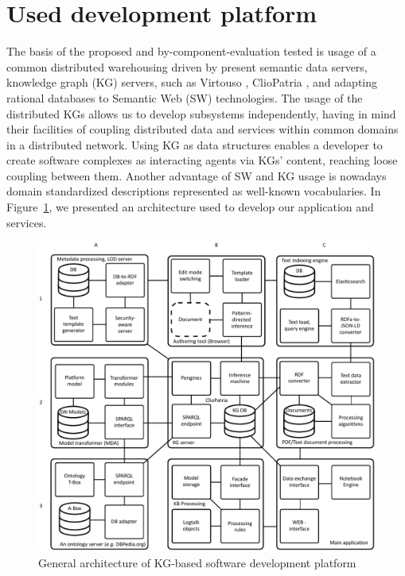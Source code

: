 \documentclass[
]{ceurart}
\begin{document}
\section{Used development platform}

The basis of the proposed and by-component-evaluation tested is usage of a common distributed warehousing driven by present semantic data servers, knowledge graph (KG) servers, such as Virtouso \cite{virtuoso}, ClioPatria \cite{cliopatria}, and adapting rational databases to Semantic Web (SW) technologies.  The usage of the distributed KGs allows us to develop subsystems independently, having in mind their facilities of coupling distributed data and services within common domains in a distributed network.  Using KG as data structures enables a developer to create software complexes as interacting agents via KGs' content, reaching loose coupling between them.  Another advantage of SW and KG usage is nowadays domain standardized descriptions represented as well-known vocabularies.  In Figure~\ref{fig:arch}, we presented an architecture used to develop our application and services.

\begin{figure}
\centering
\includegraphics[width=1\linewidth]{architecture-mda-lod-ext-general.pdf}
\caption{General architecture of KG-based software development platform}
\label{fig:arch}
\end{figure}
\end{document}
